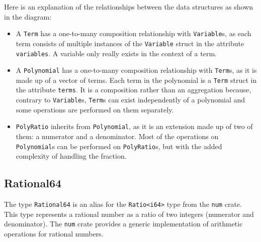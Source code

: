 \begin{center}
\end{center}   
    
    
Here is an explanation of the relationships between the data structures as shown in the diagram:

\begin{itemize}
    \item A \verb|Term| has a one-to-many composition relationship with \verb|Variable|s, as each term consists of multiple instances of the \verb|Variable| struct in the attribute \verb|variables|. A variable only really exists in the context of a term.
    \item A \verb|Polynomial| has a one-to-many composition relationship with \verb|Term|s, as it is made up of a vector of terms. Each term in the polynomial is a \verb|Term| struct in the attribute \verb|terms|. It is a composition rather than an aggregation because, contrary to \verb|Variable|s, \verb|Term|s can exist independently of a polynomial and some operations are performed on them separately.
    \item \verb|PolyRatio| inherits from \verb|Polynomial|, as it is an extension made up of two of them: a numerator and a denominator. Most of the operations on \verb|Polynomial|s can be performed on \verb|PolyRatio|s, but with the added complexity of handling the fraction.
\end{itemize}

\subsection{Rational64}\label{subsec:ratio64}

The type \verb|Rational64| is an alias for the \verb|Ratio<i64>| type from the \verb|num| crate. This type represents a rational number as a ratio of two integers (numerator and denominator). The \verb|num| crate provides a generic implementation of arithmetic operations for rational numbers.

